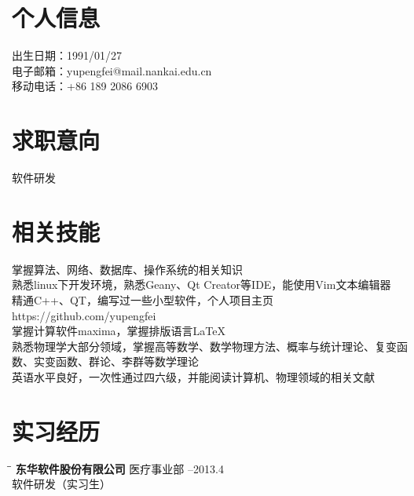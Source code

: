 \documentclass{res}
\begin{document}
 
\begin{CJK}{UTF8}{gbsn}


                                  
\begin{resume}

\section{个人信息} 
出生日期：1991/01/27\\
电子邮箱：yupengfei@mail.nankai.edu.cn\\
移动电话：+86 189 2086 6903
\section{求职意向}          
    软件研发         
 
\section{相关技能} 
    掌握算法、网络、数据库、操作系统的相关知识       \\         
    熟悉linux下开发环境，熟悉Geany、Qt Creator等IDE，能使用Vim文本编辑器\\
    精通C++、QT，编写过一些小型软件，个人项目主页https://github.com/yupengfei   \\  
    掌握计算软件maxima，掌握排版语言\LaTeX{}\\    
    熟悉物理学大部分领域，掌握高等数学、数学物理方法、概率与统计理论、复变函数、实变函数、群论、李群等数学理论\\
    英语水平良好，一次性通过四六级，并能阅读计算机、物理领域的相关文献
             

\section{实习经历}
 \vspace{-0.1in}	
   \begin{tabbing}
   \hspace{2.3in}\= \hspace{2.6in}\= \kill %
    {\bf 东华软件股份有限公司} \>医疗事业部     --2013.4\\
                             \>软件研发（实习生）
   \end{tabbing}\vspace{-20pt}      %

\end{resume}
\end{CJK}
\end{document}
